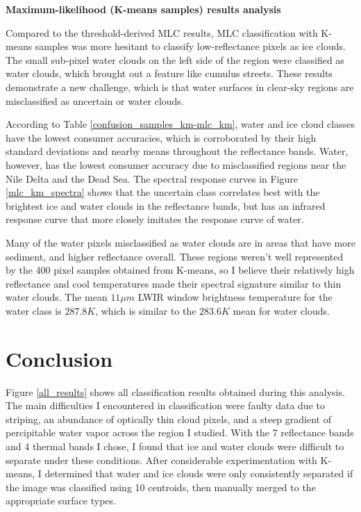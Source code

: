 \documentclass[12pt]{article}
\begin{document}
\noindent
\textbf{Maximum-likelihood (K-means samples) results analysis}

Compared to the threshold-derived MLC results, MLC classification with K-means samples was more hesitant to classify low-reflectance pixels as ice clouds. The small sub-pixel water clouds on the left side of the region were classified as water clouds, which brought out a feature like cumulus streets. These results demonstrate a new challenge, which is that water surfaces in clear-sky regions are misclassified as uncertain or water clouds.

According to Table \ref{confusion_samples_km-mlc_km}, water and ice cloud classes have the lowest consumer accuracies, which is corroborated by their high standard deviations and nearby means throughout the reflectance bands. Water, however, has the lowest consumer accuracy due to misclassified regions near the Nile Delta and the Dead Sea. The spectral response curves in Figure \ref{mlc_km_spectra} shows that the uncertain class correlates best with the brightest ice and water clouds in the reflectance bands, but has an infrared response curve that more closely imitates the response curve of water.

Many of the water pixels misclassified as water clouds are in areas that have more sediment, and higher reflectance overall. These regions weren't well represented by the 400 pixel samples obtained from K-means, so I believe their relatively high reflectance and cool temperatures made their spectral signature similar to thin water clouds. The mean $11\mu m$ LWIR window brightness temperature for the water class is $287.8 K$, which is similar to the $283.6 K$ mean for water clouds.

\clearpage

\section{Conclusion}

Figure \ref{all_results} shows all classification results obtained during this analysis. The main difficulties I encountered in classification were faulty data due to striping, an abundance of optically thin cloud pixels, and a steep gradient of percipitable water vapor across the region I studied. With the 7 reflectance bands and 4 thermal bands I chose, I found that ice and water clouds were difficult to separate under these conditions. After considerable experimentation with K-means, I determined that water and ice clouds were only consistently separated if the image was classified using 10 centroids, then manually merged to the appropriate surface types.
\end{document}
